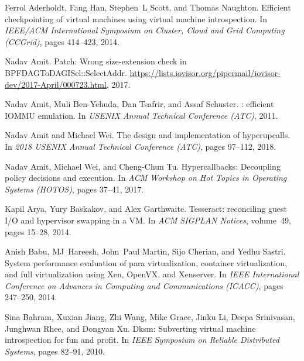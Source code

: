 \documentclass[11pt]{article}
\begin{document}
\begin{thebibliography}{10} 
  \itemsep=1pt 
  \begin{small}

  Ferrol Aderholdt, Fang Han, Stephen~L Scott, and Thomas Naughton.
  \newblock Efficient checkpointing of virtual machines using virtual machine
    introspection.
  \newblock In {\em IEEE/ACM International Symposium on Cluster, Cloud and Grid
    Computing (CCGrid)}, pages 414--423, 2014.
  
  Nadav Amit.
  \newblock Patch: Wrong size-extension check in {BPFDAGToDAGISel::SelectAddr}.
  \newblock
    \url{https://lists.iovisor.org/pipermail/iovisor-dev/2017-April/000723.html},
    2017.
  
  Nadav Amit, Muli Ben-Yehuda, Dan Tsafrir, and Assaf Schuster.
  : efficient {IOMMU} emulation.
  \newblock In {\em USENIX Annual Technical Conference (ATC)}, 2011.
  
  Nadav Amit and Michael Wei.
  \newblock The design and implementation of hyperupcalls.
  \newblock In {\em 2018 USENIX Annual Technical Conference (ATC)}, pages
    97--112, 2018.
  
  Nadav Amit, Michael Wei, and Cheng-Chun Tu.
  \newblock Hypercallbacks: Decoupling policy decisions and execution.
  \newblock In {\em ACM Workshop on Hot Topics in Operating Systems (HOTOS)},
    pages 37--41, 2017.
  
  Kapil Arya, Yury Baskakov, and Alex Garthwaite.
  \newblock Tesseract: reconciling guest {I/O} and hypervisor swapping in a {VM}.
  \newblock In {\em ACM SIGPLAN Notices}, volume~49, pages 15--28, 2014.
  
  Anish Babu, MJ~Hareesh, John~Paul Martin, Sijo Cherian, and Yedhu Sastri.
  \newblock System performance evaluation of para virtualization, container
    virtualization, and full virtualization using {Xen, OpenVX, and Xenserver}.
  \newblock In {\em {IEEE International Conference on Advances in Computing and
    Communications (ICACC)}}, pages 247--250, 2014.
  
  Sina Bahram, Xuxian Jiang, Zhi Wang, Mike Grace, Jinku Li, Deepa Srinivasan,
    Junghwan Rhee, and Dongyan Xu.
  \newblock Dksm: Subverting virtual machine introspection for fun and profit.
  \newblock In {\em IEEE Symposium on Reliable Distributed Systems}, pages
    82--91, 2010.
  

\end{small}
\end{thebibliography}
\end{document}
